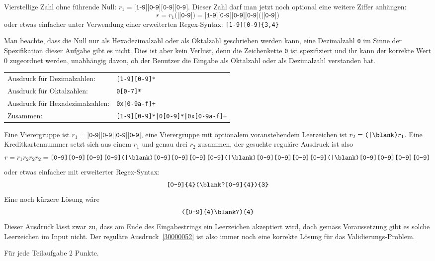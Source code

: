 \begin{loesung}
\begin{teilaufgaben}
\item 
Vierstellige Zahl ohne führende Null:
$r_1 = \texttt{[1-9][0-9][0-9][0-9]}$.
Dieser Zahl darf man jetzt noch optional eine weitere Ziffer anhängen:
\[
r=r_1\texttt{(|[0-9])}
=
\texttt{[1-9][0-9][0-9][0-9](|[0-9])}
\]
oder etwas einfacher unter Verwendung einer erweiterten Regex-Syntax:
\texttt{[1-9][0-9]\{3,4\}}
\item
Man beachte, dass die Null nur als Hexadezimalzahl oder als Oktalzahl
geschrieben werden kann, eine Dezimalzahl \texttt{0} im Sinne der Spezifikation
dieser Aufgabe gibt es nicht.
Dies ist aber kein Verlust, denn die Zeichenkette \texttt{0} ist spezifiziert
und ihr kann der korrekte Wert $0$ zugeordnet werden, unabhängig davon, ob
der Benutzer die Eingabe als Oktalzahl oder als Dezimalzahl verstanden hat.
\begin{center}
\begin{tabular}{ll}
Ausdruck für Dezimalzahlen:&\texttt{[1-9][0-9]*}\\
Ausdruck für Oktalzahlen:&\texttt{0[0-7]*}\\
Ausdruck für Hexadezimalzahlen:&\texttt{0x[0-9a-f]+}\\
Zusammen:&\texttt{[1-9][0-9]*|0[0-9]*|0x[0-9a-f]+}
\end{tabular}
\end{center}
\item
Eine Vierergruppe ist $r_1 = \texttt{[0-9][0-9][0-9][0-9]}$,
eine Vierergruppe mit optionalem voranstehendem Leerzeichen ist
$r_2 = \texttt{(|\blank)}r_1$.
Eine Kreditkartennummer setzt sich aus einem $r_1$ und genau drei
$r_2$ zusammen, der gesuchte reguläre Ausdruck ist also
\[
r = r_1r_2r_2r_2 = 
\texttt{[0-9][0-9][0-9][0-9]%
(|\blank)[0-9][0-9][0-9][0-9]%
(|\blank)[0-9][0-9][0-9][0-9]%
(|\blank)[0-9][0-9][0-9][0-9]}
\]
oder etwas einfacher mit erweiterter Regex-Syntax:
\[
\texttt{[0-9]\{4\}(\blank?[0-9]\{4\})\{3\}}
\]
Eine noch kürzere Lösung wäre
\begin{equation}
\texttt{([0-9]\{4\}\blank?)\{4\}}
\label{30000052}
\end{equation}
Dieser Ausdruck lässt zwar zu, dass am Ende des Eingabestrings ein
Leerzeichen akzeptiert wird, doch gemäss Voraussetzung gibt es solche
Leerzeichen im Input nicht.
Der reguläre Ausdruck~\eqref{30000052} ist also immer noch eine korrekte 
Lösung für das Validierungs-Problem.
\end{teilaufgaben}
\end{loesung}

\begin{bewertung}
Für jede Teilaufgabe 2 Punkte.
\end{bewertung}

